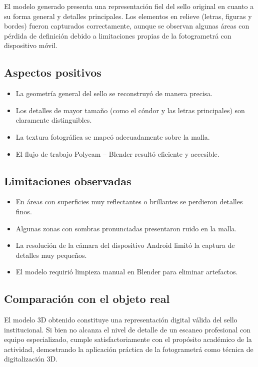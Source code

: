 \documentclass[12pt,a4paper]{article}
\begin{document}
El modelo generado presenta una representaci\'on fiel del sello original en cuanto a su forma general y detalles principales. Los elementos en relieve (letras, figuras y bordes) fueron capturados correctamente, aunque se observan algunas \'areas con p\'erdida de definici\'on debido a limitaciones propias de la fotogrametr\'a con dispositivo m\'ovil.

\subsection{Aspectos positivos}

\begin{itemize}
    \item La geometr\'ia general del sello se reconstruy\'o de manera precisa.
    \item Los detalles de mayor tama\~no (como el c\'ondor y las letras principales) son claramente distinguibles.
    \item La textura fotogr\'afica se mape\'o adecuadamente sobre la malla.
    \item El flujo de trabajo Polycam -- Blender result\'o eficiente y accesible.
\end{itemize}

\subsection{Limitaciones observadas}

\begin{itemize}
    \item En \'areas con superficies muy reflectantes o brillantes se perdieron detalles finos.
    \item Algunas zonas con sombras pronunciadas presentaron ruido en la malla.
    \item La resoluci\'on de la c\'amara del dispositivo Android limit\'o la captura de detalles muy peque\~nos.
    \item El modelo requiri\'o limpieza manual en Blender para eliminar artefactos.
\end{itemize}

\subsection{Comparaci\'on con el objeto real}

El modelo 3D obtenido constituye una representaci\'on digital v\'alida del sello institucional. Si bien no alcanza el nivel de detalle de un escaneo profesional con equipo especializado, cumple satisfactoriamente con el prop\'osito acad\'emico de la actividad, demostrando la aplicaci\'on pr\'actica de la fotogrametr\'a como t\'ecnica de digitalizaci\'on 3D.
\end{document}
